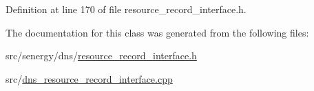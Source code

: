 Definition at line 170 of file resource\-\_\-record\-\_\-interface.\-h.



The documentation for this class was generated from the following files\-:\begin{DoxyCompactItemize}
\item 
src/senergy/dns/\hyperlink{resource__record__interface_8h}{resource\-\_\-record\-\_\-interface.\-h}\item 
src/\hyperlink{dns__resource__record__interface_8cpp}{dns\-\_\-resource\-\_\-record\-\_\-interface.\-cpp}\end{DoxyCompactItemize}
